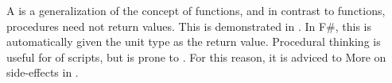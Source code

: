 \documentclass[fsharpNotes.tex]{subfiles}
\begin{document}
A  is a generalization of the concept of functions, and in contrast to functions, procedures need not return values. This is demonstrated in .
%
%
In F\#, this is automatically given the unit type as the return value. Procedural thinking is useful for  of scripts, but is prone to . 
For this reason, it is adviced to   More on side-effects in .
\end{document}
